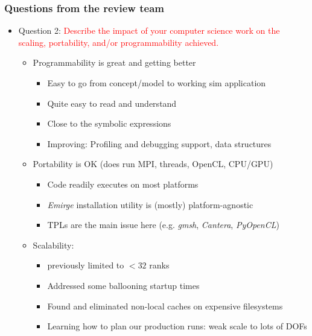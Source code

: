 \begin{frame}\frametitle{Questions from the review team}
  \begin{itemize}
  \item Question 2: \textcolor{red}{Describe the impact of your computer science work on the scaling, portability, and/or programmability achieved.}
    \begin{itemize}
    \item Programmability is great and getting better
      \begin{itemize}
      \item Easy to go from concept/model to working sim application
      \item Quite easy to read and understand 
      \item Close to the symbolic expressions
      \item Improving: Profiling and debugging support, data structures
      \end{itemize}
    \item Portability is OK (does run MPI, threads, OpenCL, CPU/GPU)
      \begin{itemize}
      \item Code readily executes on most platforms
      \item \textit{Emirge} installation utility is (mostly) platform-agnostic
      \item TPLs are the main issue here (e.g. \textit{gmsh}, \textit{Cantera}, \textit{PyOpenCL})
      \end{itemize}
    \item Scalability:
      \begin{itemize}
      \item previously limited to $< 32$ ranks 
      \item Addressed some ballooning startup times
      \item Found and eliminated non-local caches on expensive filesystems
      \item Learning how to plan our production runs: weak scale to lots of DOFs
      \end{itemize}
    \end{itemize}
  \end{itemize}
\end{frame}

